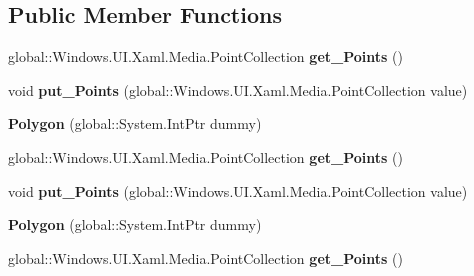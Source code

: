 \subsection*{Public Member Functions}
\begin{DoxyCompactItemize}
\item 
\mbox{\label{class_windows_1_1_u_i_1_1_xaml_1_1_shapes_1_1_polygon_afd4470cca2e8e02dfe5091d16a91f6bd}} 
global\+::\+Windows.\+U\+I.\+Xaml.\+Media.\+Point\+Collection {\bfseries get\+\_\+\+Points} ()
\item 
\mbox{\label{class_windows_1_1_u_i_1_1_xaml_1_1_shapes_1_1_polygon_a6e9071faca39d4aa0570ba72edba9c6c}} 
void {\bfseries put\+\_\+\+Points} (global\+::\+Windows.\+U\+I.\+Xaml.\+Media.\+Point\+Collection value)
\item 
\mbox{\label{class_windows_1_1_u_i_1_1_xaml_1_1_shapes_1_1_polygon_a7ac83122ba7ccd42efd565804bca2d0a}} 
{\bfseries Polygon} (global\+::\+System.\+Int\+Ptr dummy)
\item 
\mbox{\label{class_windows_1_1_u_i_1_1_xaml_1_1_shapes_1_1_polygon_afd4470cca2e8e02dfe5091d16a91f6bd}} 
global\+::\+Windows.\+U\+I.\+Xaml.\+Media.\+Point\+Collection {\bfseries get\+\_\+\+Points} ()
\item 
\mbox{\label{class_windows_1_1_u_i_1_1_xaml_1_1_shapes_1_1_polygon_a6e9071faca39d4aa0570ba72edba9c6c}} 
void {\bfseries put\+\_\+\+Points} (global\+::\+Windows.\+U\+I.\+Xaml.\+Media.\+Point\+Collection value)
\item 
\mbox{\label{class_windows_1_1_u_i_1_1_xaml_1_1_shapes_1_1_polygon_a7ac83122ba7ccd42efd565804bca2d0a}} 
{\bfseries Polygon} (global\+::\+System.\+Int\+Ptr dummy)
\item 
\mbox{\label{class_windows_1_1_u_i_1_1_xaml_1_1_shapes_1_1_polygon_afd4470cca2e8e02dfe5091d16a91f6bd}} 
global\+::\+Windows.\+U\+I.\+Xaml.\+Media.\+Point\+Collection {\bfseries get\+\_\+\+Points} ()

\end{DoxyCompactItemize}
